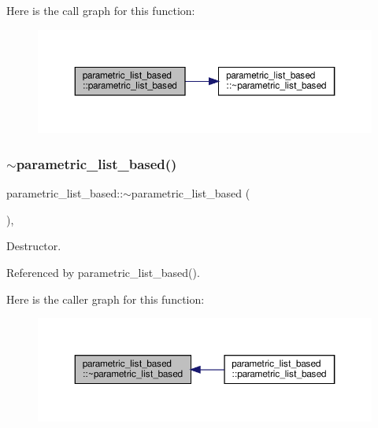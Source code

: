 Here is the call graph for this function\+:
\nopagebreak
\begin{figure}[H]
\begin{center}
\leavevmode
\includegraphics[width=350pt]{d7/d47/classparametric__list__based_a10067b837be6ed6afd89010346ec51d3_cgraph}
\end{center}
\end{figure}
\mbox{\label{classparametric__list__based_a088790da3c76d207bee5fb68b4fecea0}} 
\subsubsection{\texorpdfstring{$\sim$parametric\+\_\+list\+\_\+based()}{~parametric\_list\_based()}}
{\footnotesize\ttfamily parametric\+\_\+list\+\_\+based\+::$\sim$parametric\+\_\+list\+\_\+based (\begin{DoxyParamCaption}{ }\end{DoxyParamCaption})\hspace{0.3cm}{\ttfamily [override]}, {\ttfamily [default]}}



Destructor. 



Referenced by parametric\+\_\+list\+\_\+based().

Here is the caller graph for this function\+:
\nopagebreak
\begin{figure}[H]
\begin{center}
\leavevmode
\includegraphics[width=350pt]{d7/d47/classparametric__list__based_a088790da3c76d207bee5fb68b4fecea0_icgraph}
\end{center}
\end{figure}


